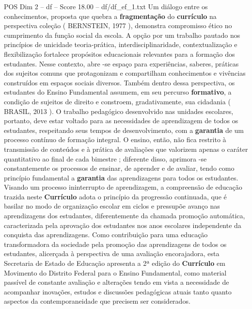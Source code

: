\begin{textsample}{POS Dim 2 – df – Score 18.00 – df/df\_ef\_1.txt}
Um diálogo entre os conhecimentos, proposta que quebra a \textbf{fragmentação} do \textbf{currículo} na perspectiva coleção ( BERNSTEIN, 1977 ), demonstra compromisso ético no cumprimento da função social da escola.
A opção por um trabalho pautado nos princípios de unicidade teoria-prática, interdisciplinaridade, contextualização e flexibilização fortalece propósitos educacionais relevantes para a formação dos estudantes.
Nesse contexto, abre -se espaço para experiências, saberes, práticas dos sujeitos comuns que protagonizam e compartilham conhecimentos e vivências construídos em espaços sociais diversos.
Também dentro dessa perspectiva, os estudantes do Ensino Fundamental assumem, em seu percurso \textbf{formativo}, a condição de sujeitos de direito e constroem, gradativamente, sua cidadania ( BRASIL, 2013 ).
O trabalho pedagógico desenvolvido nas unidades escolares, portanto, deve estar voltado para as necessidades de aprendizagem de todos os estudantes, respeitando seus tempos de desenvolvimento, com a \textbf{garantia} de um processo contínuo de formação integral.
O ensino, então, não fica restrito à transmissão de conteúdos e à prática de avaliações que valorizem apenas o caráter quantitativo ao final de cada bimestre ; diferente disso, aprimora -se constantemente os processos de ensinar, de aprender e de avaliar, tendo como princípio fundamental a \textbf{garantia} das aprendizagens para todos os estudantes.
Visando um processo ininterrupto de aprendizagem, a compreensão de educação trazida neste \textbf{Currículo} adota o princípio da progressão continuada, que é basilar no modo de organização escolar em ciclos e pressupõe avanço nas aprendizagens dos estudantes, diferentemente da chamada promoção automática, caracterizada pela aprovação dos estudantes nos anos escolares independente da conquista das aprendizagens.
Como contribuição para uma educação transformadora da sociedade pela promoção das aprendizagens de todos os estudantes, alicerçada à perspectiva de uma avaliação encorajadora, esta Secretaria de Estado de Educação apresenta a 2ª edição do \textbf{Currículo} em Movimento do Distrito Federal para o Ensino Fundamental, como material passível de constante avaliação e alterações tendo em vista a necessidade de acompanhar inovações, estudos e discussões pedagógicas atuais tanto quanto aspectos da contemporaneidade que precisem ser considerados.

\end{textsample}
